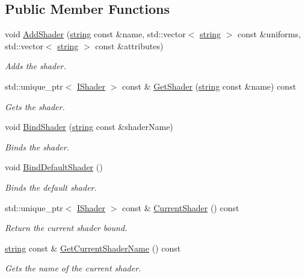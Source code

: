 \subsection*{Public Member Functions}
\begin{DoxyCompactItemize}
\item 
void \hyperlink{struct_shader_library_a5fac5a46dda49ceb6d1d361fd68b62a2}{Add\+Shader} (\hyperlink{_types_8h_ad453f9f71ce1f9153fb748d6bb25e454}{string} const \&name, std\+::vector$<$ \hyperlink{_types_8h_ad453f9f71ce1f9153fb748d6bb25e454}{string} $>$ const \&uniforms, std\+::vector$<$ \hyperlink{_types_8h_ad453f9f71ce1f9153fb748d6bb25e454}{string} $>$ const \&attributes)
\begin{DoxyCompactList}\small\item\em Adds the shader. \end{DoxyCompactList}\item 
std\+::unique\+\_\+ptr$<$ \hyperlink{class_i_shader}{I\+Shader} $>$ const \& \hyperlink{struct_shader_library_a91d0625cf1e99a3fa7f88423d37f5a9f}{Get\+Shader} (\hyperlink{_types_8h_ad453f9f71ce1f9153fb748d6bb25e454}{string} const \&name) const 
\begin{DoxyCompactList}\small\item\em Gets the shader. \end{DoxyCompactList}\item 
void \hyperlink{struct_shader_library_addba2e2f925252895b9475381c837071}{Bind\+Shader} (\hyperlink{_types_8h_ad453f9f71ce1f9153fb748d6bb25e454}{string} const \&shader\+Name)
\begin{DoxyCompactList}\small\item\em Binds the shader. \end{DoxyCompactList}\item 
void \hyperlink{struct_shader_library_ae893912c0983391dd4a988655f5e72f9}{Bind\+Default\+Shader} ()
\begin{DoxyCompactList}\small\item\em Binds the default shader. \end{DoxyCompactList}\item 
std\+::unique\+\_\+ptr$<$ \hyperlink{class_i_shader}{I\+Shader} $>$ const \& \hyperlink{struct_shader_library_af15e65d4d0b648272428fc167a6d03b9}{Current\+Shader} () const 
\begin{DoxyCompactList}\small\item\em Return the current shader bound. \end{DoxyCompactList}\item 
\hyperlink{_types_8h_ad453f9f71ce1f9153fb748d6bb25e454}{string} const \& \hyperlink{struct_shader_library_a2fb593add0c096c41787e67476e99e0c}{Get\+Current\+Shader\+Name} () const 
\begin{DoxyCompactList}\small\item\em Gets the name of the current shader. \end{DoxyCompactList}\end{DoxyCompactItemize}
